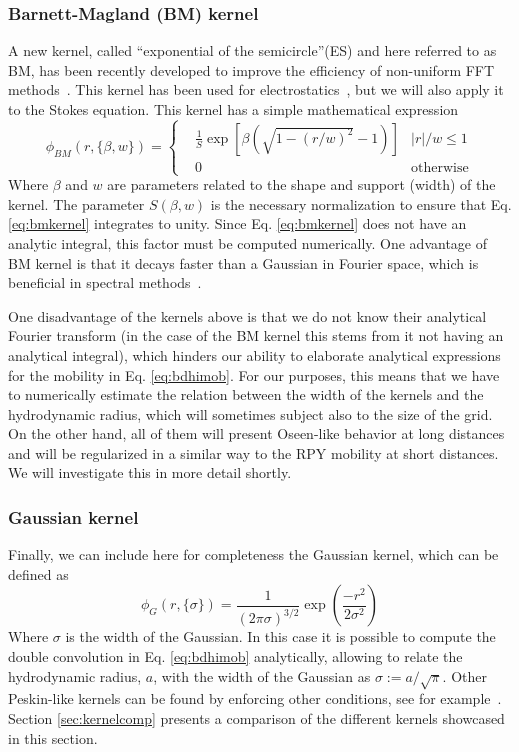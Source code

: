 \documentclass[ twoside,openright,titlepage,numbers=noenddot,%
headinclude,footinclude,cleardoublepage=empty,abstract=on,
BCOR=5mm,paper=b5,fontsize=11pt, dvipsnames
]{scrreprt}
\begin{document}
\subsubsection*{Barnett-Magland (BM) kernel}
A new kernel, called ``exponential of the semicircle''(ES) and here referred to as BM, has been recently developed to improve the efficiency of non-uniform \gls{FFT} methods~\cite{Barnett2019}. This kernel has been used for electrostatics~\cite{Shamshirgar2021}, but we will also apply it to the Stokes equation. This kernel has a simple mathematical expression
\begin{equation}
  \label{eq:bmkernel}
  \phi_{BM}(r,\{\beta, w\}) = \left\{
  \begin{aligned}
    &\frac{1}{S}\exp\left[\beta(\sqrt{1-(r/w)^2}-1)\right] & |r|/w\le 1\\
    & 0 & \textrm{otherwise}
  \end{aligned}\right.
\end{equation}
Where $\beta$ and $w$ are parameters related to the shape and support (width) of the kernel. The parameter $S(\beta, w)$ is the necessary normalization to ensure that Eq. \eqref{eq:bmkernel} integrates to unity. Since Eq. \eqref{eq:bmkernel} does not have an analytic integral, this factor must be computed numerically. One advantage of BM kernel is that it decays faster than a Gaussian in Fourier space, which is beneficial in spectral methods~\cite{Barnett2019}.

One disadvantage of the kernels above is that we do not know their analytical Fourier transform (in the case of the BM kernel this stems from it not having an analytical integral), which hinders our ability to elaborate analytical expressions for the mobility in Eq. \eqref{eq:bdhimob}.
For our purposes, this means that we have to numerically estimate the relation between the width of the kernels and the hydrodynamic radius, which will sometimes subject also to the size of the grid.
On the other hand, all of them will present Oseen-like behavior at long distances and will be regularized in a similar way to the \gls{RPY} mobility at short distances.
We will investigate this in more detail shortly.
\subsubsection*{Gaussian kernel}
Finally, we can include here for completeness the Gaussian kernel, which can be defined as
\begin{equation}
  \label{eq:gaussiankernel}
  \phi_G(r,\{\sigma\}) = \frac{1}{(2\pi\sigma)^{3/2}}\exp\left(\frac{-r^2}{2\sigma^2}\right)
\end{equation}
Where $\sigma$ is the width of the Gaussian.
In this case it is possible to compute the double convolution in Eq. \eqref{eq:bdhimob} analytically, allowing to relate the hydrodynamic radius, $a$, with the width of the Gaussian as $\sigma := a/\sqrt{\pi}$.
Other Peskin-like kernels can be found by enforcing other conditions, see for example~\cite{Yang2009}.
Section \ref{sec:kernelcomp} presents a comparison of the different kernels showcased in this section.
\end{document}
